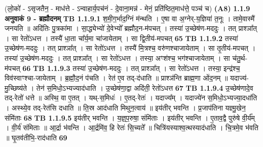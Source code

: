 \documentclass[17pt]{extarticle}
\begin{document}
                  \newline
                                    (लो॒को॑ - ऽसृजतैन॒ - माध॑त्ते - ऽन्वाहार्य॒पच॑नं - दे॒वाना॒मन्न॑ - मेनं॒ प्रति॑ष्ठित॒माध॑त्ते॒ पञ्च॑ च) \textbf{(A8)} \newline \newline
                \textbf{ 1.1.9     अनुवाकं   9 - ब्रह्मौदनम्} \newline
                                \textbf{ TB 1.1.9.1} \newline
                  श॒मी॒ग॒र्भाद॒ग्निं म॑न्थति । ए॒षा वा अ॒ग्नेर्-य॒ज्ञिया॑ त॒नूः । तामे॒वास्मै॑ जनयति ॥ अदि॑तिः पु॒त्रका॑मा । सा॒द्ध्येभ्यो॑ दे॒वेभ्यो᳚ ब्रह्मौद॒न-म॑पचत् । तस्या॑ उ॒च्छेष॑ण-मददुः । तत् प्राश्ञा᳚त् । सा रेतो॑ऽधत्त । तस्यै॑ धा॒ता चा᳚र्य॒मा चा॑जायेताम् । सा द्वि॒तीय॑-मपचत् \textbf{ 65} \newline
                  \newline
                                \textbf{ TB 1.1.9.2} \newline
                  तस्या॑ उ॒च्छेष॑ण-मददुः । तत् प्राश्ञा᳚त् । सा रेतो॑ऽधत्त । तस्यै॑ मि॒त्रश्च॒ वरु॑णश्चाजायेताम् । सा तृ॒तीय॑-मपचत् । तस्या॑ उ॒च्छेष॑ण-मददुः । तत् प्राश्ञा᳚त् । सा रेतो॑ऽधत्त । तस्या॒ अꣳश॑श्च॒ भग॑श्चाजायेताम् । सा च॑तु॒र्थ-म॑पचत् \textbf{ 66} \newline
                  \newline
                                \textbf{ TB 1.1.9.3} \newline
                  तस्या॑ उ॒च्छेष॑ण-मददुः । तत् प्राश्ञा᳚त् । सा रेतो॑ऽधत्त । तस्या॒ इन्द्र॑श्च॒ विव॑स्वाꣳश्चा-जायेताम् । ब्र॒ह्मौ॒द॒नं प॑चति । रेत॑ ए॒व तद्-द॑धाति ॥ प्राश्ञ॑न्ति ब्राह्म॒णा ओ॑द॒नम् ॥ यदाज्य॑-मु॒च्छिष्य॑ते । तेन॑ स॒मिधो॒ऽभ्यज्याद॑धाति । उ॒च्छेष॑णा॒द्वा अदि॑ती॒ रेतो॑ऽधत्त \textbf{ 67} \newline
                  \newline
                                \textbf{ TB 1.1.9.4} \newline
                  उ॒च्छेष॑णादे॒व तद्-रेतो॑ धत्ते ॥ अस्थि॒ वा ए॒तत् । यथ्-स॒मिधः॑ । ए॒तद्-रेतः॑ । यदाज्य᳚म् । यदाज्ये॑न स॒मिधो॒ऽभ्यज्या॒दधा॑ति । अस्थ्ये॒व तद्-रेत॑सि दधाति ॥ ति॒स्र आद॑धाति मिथुन॒त्वाय॑ ॥ इय॑तीर् भवन्ति । प्र॒जाप॑तिना यज्ञ्मु॒खेन॒ संमि॑ताः \textbf{ 68} \newline
                  \newline
                                \textbf{ TB 1.1.9.5} \newline
                  इय॑तीर् भवन्ति । य॒ज्ञ्॒प॒रुषा॒ संमि॑ताः । इय॑तीर् भवन्ति । ए॒ताव॒द्वै पुरु॑षे वी॒र्य᳚म् । वी॒र्य॑ संमिताः ॥ आ॒र्द्रा भ॑वन्ति । आ॒र्द्रमि॑व॒ हि रेतः॑ सि॒च्यते᳚ ॥ चित्रि॑यस्याश्व॒त्थस्याद॑धाति । चि॒त्रमे॒व भ॑वति ॥ घृ॒तव॑तीभि॒-राद॑धाति \textbf{ 69} \newline
\end{document}
